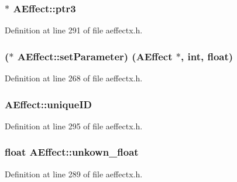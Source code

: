 \subsubsection[{\texorpdfstring{ptr3}{ptr3}}]{$\ast$ A\+Effect\+::ptr3}\hypertarget{class_a_effect_a1466e69ea4be20365c021ee250edcab0}{}\label{class_a_effect_a1466e69ea4be20365c021ee250edcab0}


Definition at line 291 of file aeffectx.\+h.

\subsubsection[{\texorpdfstring{set\+Parameter}{setParameter}}]{($\ast$  A\+Effect\+::set\+Parameter) ({\bf A\+Effect} $\ast$, {\bf int}, float)}\hypertarget{class_a_effect_a871faae111b1c4c4de4232de2eb532a4}{}\label{class_a_effect_a871faae111b1c4c4de4232de2eb532a4}


Definition at line 268 of file aeffectx.\+h.

\subsubsection[{\texorpdfstring{unique\+ID}{uniqueID}}]{ A\+Effect\+::unique\+ID}\hypertarget{class_a_effect_a91cc3890b73363e04b792f62a8826616}{}\label{class_a_effect_a91cc3890b73363e04b792f62a8826616}


Definition at line 295 of file aeffectx.\+h.

\subsubsection[{\texorpdfstring{unkown\+\_\+float}{unkown_float}}]{\setlength{\rightskip}{0pt plus 5cm}float A\+Effect\+::unkown\+\_\+float}\hypertarget{class_a_effect_a6532e10970843e93f6da4b283a579a42}{}\label{class_a_effect_a6532e10970843e93f6da4b283a579a42}


Definition at line 289 of file aeffectx.\+h.

